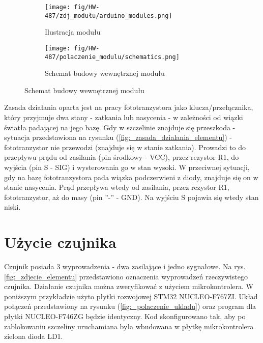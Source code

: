 \documentclass[11pt, a4paper]{article}
\begin{document}
\begin{figure}[h]
\centering
\begin{subfigure}{.5\textwidth}
\centering
\texttt{[image: fig/HW-487/zdj\_modułu/arduino\_modules.png]}
\caption{Ilustracja modułu \cite{ArduinoModules:PhotoInterrupter}}
\label{fig:_zdjecie_modulu}
\end{subfigure}%
\begin{subfigure}{.5\textwidth}
\centering
\texttt{[image: fig/HW-487/polaczenie\_modulu/schematics.png]}
\caption{Schemat budowy wewnętrznej modułu}
\label{fig:_schemat_modulu}
\end{subfigure}
\label{fig:modul}
\end{figure}
\vspace{0.25cm}
Zasada działania oparta jest na pracy fototranzystora jako klucza/przełącznika, który przyjmuje dwa stany - zatkania lub nasycenia - w zależności od wiązki światła padającej na jego bazę. Gdy w szczelinie znajduje się przeszkoda - sytuacja przedstawiona na rysunku (\ref{fig:_zasada_dzialania_elementu}) - fototranzystor nie przewodzi (znajduje się w stanie zatkania). Prowadzi to do przepływu prądu od zasilania (pin środkowy - VCC), przez rezystor R1, do wyjścia (pin S - SIG) i wysterowania go w stan wysoki. W przeciwnej sytuacji, gdy na bazę fototranzystora pada wiązka podczerwieni z diody, znajduje się on w stanie nasycenia. Prąd przepływa wtedy od zasilania, przez rezystor R1, fototranzystor, aż do masy (pin ''-'' - GND). Na wyjściu S pojawia się wtedy stan niski.

\newpage

\section{Użycie czujnika}
Czujnik posiada 3 wyprowadzenia - dwa zasilające i jedno sygnałowe. Na rys. \ref{fig:_zdjecie_elementu} przedstawiono oznaczenia wyprowadzeń rzeczywistego czujnika. Działanie czujnika można zweryfikować z użyciem mikrokontrolera. W poniższym przykładzie użyto płytki rozwojowej STM32 NUCLEO-F767ZI. Układ połączeń przedstawiony na rysunku (\ref{fig:_polaczenie_ukladu}) oraz program dla płytki NUCLEO-F746ZG będzie identyczny. Kod skonfigurowano tak, aby po zablokowaniu szczeliny uruchamiana była wbudowana w płytkę mikrokontrolera zielona dioda LD1.
\end{document}
